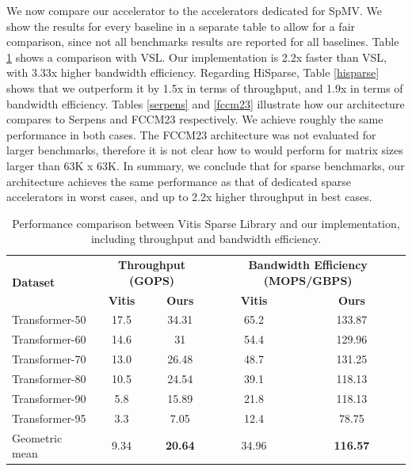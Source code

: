 \documentclass[manuscript,screen,review]{acmart}
\begin{document}
We now compare our accelerator to the accelerators dedicated for SpMV. We show the results for every baseline in a separate table to allow for a fair comparison, since not all benchmarks results are reported for all baselines.
Table \ref{vsl} shows a comparison with VSL. Our implementation is 2.2x faster than VSL, with 3.33x higher bandwidth efficiency. Regarding HiSparse, Table \ref{hisparse} shows that we outperform it by 1.5x in terms of throughput, and 1.9x in terms of bandwidth efficiency. Tables \ref{serpens} and \ref{fccm23} illustrate how our architecture compares to Serpens and FCCM23 respectively. We achieve roughly the same performance in both cases. The FCCM23 architecture was not evaluated for larger benchmarks, therefore it is not clear how to would perform for matrix sizes larger than 63K x 63K. In summary, we conclude that for sparse benchmarks, our architecture achieves the same performance as that of dedicated sparse accelerators in worst cases, and up to 2.2x higher throughput in best cases.

\begin{table}[h!]
	\centering
	\begin{tabular}{|l|c|c|c|c|}
		\hline
		\multirow{2}{*}{\textbf{Dataset}} & \multicolumn{2}{c|}{\textbf{Throughput (GOPS)}} & \multicolumn{2}{c|}{\textbf{Bandwidth Efficiency (MOPS/GBPS)}} \\
		\cline{2-5}
		& \textbf{Vitis} & \textbf{Ours} & \textbf{Vitis} & \textbf{Ours} \\
		\hline
		Transformer-50 & 17.5 & 34.31 & 65.2 & 133.87 \\
		Transformer-60 & 14.6 & 31 & 54.4 & 129.96 \\
		Transformer-70 & 13.0 & 26.48 & 48.7 & 131.25 \\
		Transformer-80 & 10.5 & 24.54 & 39.1 & 118.13 \\
		Transformer-90 & 5.8 & 15.89 & 21.8 & 118.13 \\
		Transformer-95 & 3.3 & 7.05 & 12.4 & 78.75 \\
		\hline
		Geometric mean & 9.34 & \textbf{20.64} & 34.96 & \textbf{116.57} \\
		\hline
	\end{tabular}
	\caption{Performance comparison between Vitis Sparse Library and our implementation, including throughput and bandwidth efficiency.}
	\label{vsl}
\end{table}
\end{document}
